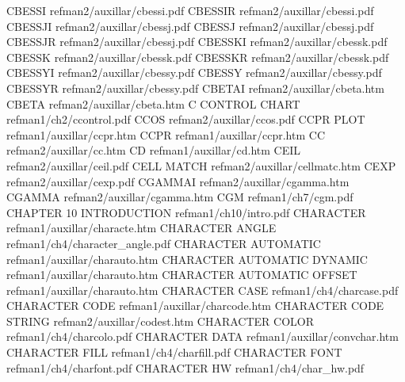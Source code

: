 CBESSI                                  refman2/auxillar/cbessi.pdf
CBESSIR                                 refman2/auxillar/cbessi.pdf
CBESSJI                                 refman2/auxillar/cbessj.pdf
CBESSJ                                  refman2/auxillar/cbessj.pdf
CBESSJR                                 refman2/auxillar/cbessj.pdf
CBESSKI                                 refman2/auxillar/cbessk.pdf
CBESSK                                  refman2/auxillar/cbessk.pdf
CBESSKR                                 refman2/auxillar/cbessk.pdf
CBESSYI                                 refman2/auxillar/cbessy.pdf
CBESSY                                  refman2/auxillar/cbessy.pdf
CBESSYR                                 refman2/auxillar/cbessy.pdf
CBETAI                                  refman2/auxillar/cbeta.htm
CBETA                                   refman2/auxillar/cbeta.htm
C CONTROL CHART                         refman1/ch2/ccontrol.pdf
CCOS                                    refman2/auxillar/ccos.pdf
CCPR PLOT                               refman1/auxillar/ccpr.htm
CCPR                                    refman1/auxillar/ccpr.htm
CC                                      refman2/auxillar/cc.htm
CD                                      refman1/auxillar/cd.htm
CEIL                                    refman2/auxillar/ceil.pdf
CELL MATCH                              refman2/auxillar/cellmatc.htm
CEXP                                    refman2/auxillar/cexp.pdf
CGAMMAI                                 refman2/auxillar/cgamma.htm
CGAMMA                                  refman2/auxillar/cgamma.htm
CGM                                     refman1/ch7/cgm.pdf
CHAPTER 10 INTRODUCTION                 refman1/ch10/intro.pdf
CHARACTER                               refman1/auxillar/characte.htm
CHARACTER ANGLE                         refman1/ch4/character_angle.pdf
CHARACTER AUTOMATIC                     refman1/auxillar/charauto.htm
CHARACTER AUTOMATIC DYNAMIC             refman1/auxillar/charauto.htm
CHARACTER AUTOMATIC OFFSET              refman1/auxillar/charauto.htm
CHARACTER CASE                          refman1/ch4/charcase.pdf
CHARACTER CODE                          refman1/auxillar/charcode.htm
CHARACTER CODE STRING                   refman2/auxillar/codest.htm
CHARACTER COLOR                         refman1/ch4/charcolo.pdf
CHARACTER DATA                          refman1/auxillar/convchar.htm
CHARACTER FILL                          refman1/ch4/charfill.pdf
CHARACTER FONT                          refman1/ch4/charfont.pdf
CHARACTER HW                            refman1/ch4/char_hw.pdf

